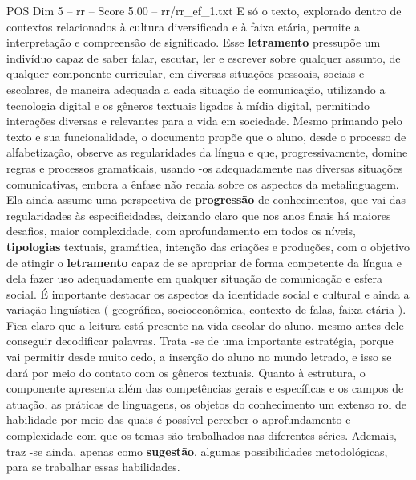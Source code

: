\begin{textsample}{POS Dim 5 – rr – Score 5.00 – rr/rr\_ef\_1.txt}
E só o texto, explorado dentro de contextos relacionados à cultura diversificada e à faixa etária, permite a interpretação e compreensão de significado.
Esse \textbf{letramento} pressupõe um indivíduo capaz de saber falar, escutar, ler e escrever sobre qualquer assunto, de qualquer componente curricular, em diversas situações pessoais, sociais e escolares, de maneira adequada a cada situação de comunicação, utilizando a tecnologia digital e os gêneros textuais ligados à mídia digital, permitindo interações diversas e relevantes para a vida em sociedade.
Mesmo primando pelo texto e sua funcionalidade, o documento propõe que o aluno, desde o processo de alfabetização, observe as regularidades da língua e que, progressivamente, domine regras e processos gramaticais, usando -os adequadamente nas diversas situações comunicativas, embora a ênfase não recaia sobre os aspectos da metalinguagem.
Ela ainda assume uma perspectiva de \textbf{progressão} de conhecimentos, que vai das regularidades às especificidades, deixando claro que nos anos finais há maiores desafios, maior complexidade, com aprofundamento em todos os níveis, \textbf{tipologias} textuais, gramática, intenção das criações e produções, com o objetivo de atingir o \textbf{letramento} capaz de se apropriar de forma competente da língua e dela fazer uso adequadamente em qualquer situação de comunicação e esfera social.
É importante destacar os aspectos da identidade social e cultural e ainda a variação linguística ( geográfica, socioeconômica, contexto de falas, faixa etária ).
Fica claro que a leitura está presente na vida escolar do aluno, mesmo antes dele conseguir decodificar palavras.
Trata -se de uma importante estratégia, porque vai permitir desde muito cedo, a inserção do aluno no mundo letrado, e isso se dará por meio do contato com os gêneros textuais.
Quanto à estrutura, o componente apresenta além das competências gerais e específicas e os campos de atuação, as práticas de linguagens, os objetos do conhecimento um extenso rol de habilidade por meio das quais é possível perceber o aprofundamento e complexidade com que os temas são trabalhados nas diferentes séries.
Ademais, traz -se ainda, apenas como \textbf{sugestão}, algumas possibilidades metodológicas, para se trabalhar essas habilidades.

\end{textsample}
